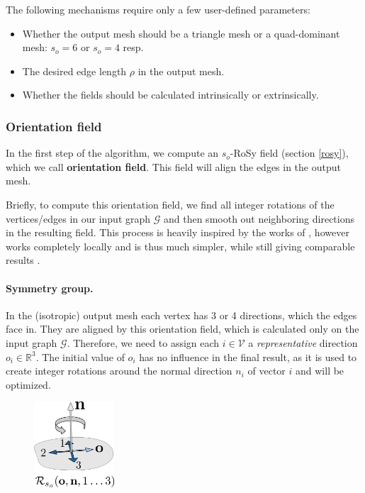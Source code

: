 \documentclass{ACGSeminar}
\begin{document}
The following mechanisms require only a few user-defined parameters:
\begin{itemize}
	\item	Whether the output mesh should be a triangle mesh or a quad-dominant mesh: $s_o = 6$ or $s_o = 4$ resp.
	\item	The desired edge length $\rho$ in the output mesh.
	\item	Whether the fields should be calculated intrinsically or extrinsically.
\end{itemize}

\subsubsection{Orientation field}\label{orientation-field}
In the first step of the algorithm, we compute an $s_o$-RoSy field (section \ref{rosy}), which we call \textbf{orientation field}. This field will align the edges in the output mesh.\bigskip

Briefly, to compute this orientation field, we find all integer rotations of the vertices/edges in our input graph $\mathcal{G}$ and then smooth out neighboring directions in the resulting field. This process is heavily inspired by the works of \cite{bommes2009mixed,ray2008n}, however works completely locally and is thus much simpler, while still giving comparable results \cite{jakob2015instant}.

\paragraph{Symmetry group.}
In the (isotropic) output mesh each vertex has 3 or 4 directions, which the edges face in. They are aligned by this orientation field, which is calculated only on the input graph $\mathcal{G}$. Therefore, we need to assign each $i \in \mathcal{V}$ a \textit{representative} direction $o_i \in \mathbb{R}^3$. The initial value of $o_i$ has no influence in the final result, as it is used to create integer rotations around the normal direction $n_i$ of vector $i$ and will be optimized.\bigskip

\begin{figure}
	\includegraphics[width=3cm]{img/integer-rotation.png}\par
	\label{fig:integer-rotation}
\end{figure}
\end{document}
